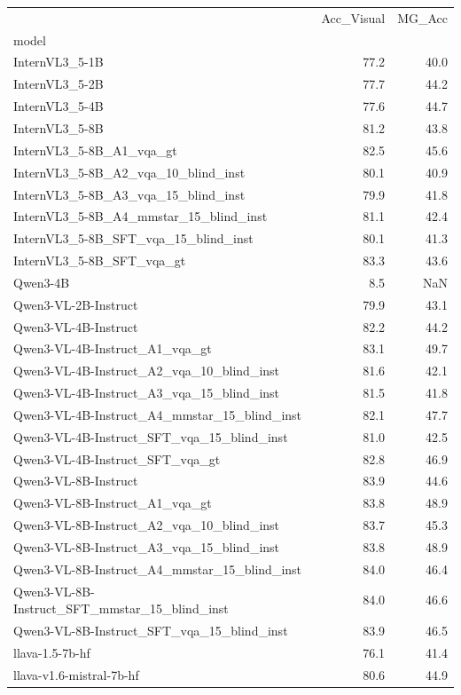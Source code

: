 \begin{tabular}{lrr}
\toprule
 & Acc_Visual & MG_Acc \\
model &  &  \\
\midrule
InternVL3_5-1B & 77.2 & 40.0 \\
InternVL3_5-2B & 77.7 & 44.2 \\
InternVL3_5-4B & 77.6 & 44.7 \\
InternVL3_5-8B & 81.2 & 43.8 \\
InternVL3_5-8B_A1_vqa_gt & 82.5 & 45.6 \\
InternVL3_5-8B_A2_vqa_10_blind_inst & 80.1 & 40.9 \\
InternVL3_5-8B_A3_vqa_15_blind_inst & 79.9 & 41.8 \\
InternVL3_5-8B_A4_mmstar_15_blind_inst & 81.1 & 42.4 \\
InternVL3_5-8B_SFT_vqa_15_blind_inst & 80.1 & 41.3 \\
InternVL3_5-8B_SFT_vqa_gt & 83.3 & 43.6 \\
Qwen3-4B & 8.5 & NaN \\
Qwen3-VL-2B-Instruct & 79.9 & 43.1 \\
Qwen3-VL-4B-Instruct & 82.2 & 44.2 \\
Qwen3-VL-4B-Instruct_A1_vqa_gt & 83.1 & 49.7 \\
Qwen3-VL-4B-Instruct_A2_vqa_10_blind_inst & 81.6 & 42.1 \\
Qwen3-VL-4B-Instruct_A3_vqa_15_blind_inst & 81.5 & 41.8 \\
Qwen3-VL-4B-Instruct_A4_mmstar_15_blind_inst & 82.1 & 47.7 \\
Qwen3-VL-4B-Instruct_SFT_vqa_15_blind_inst & 81.0 & 42.5 \\
Qwen3-VL-4B-Instruct_SFT_vqa_gt & 82.8 & 46.9 \\
Qwen3-VL-8B-Instruct & 83.9 & 44.6 \\
Qwen3-VL-8B-Instruct_A1_vqa_gt & 83.8 & 48.9 \\
Qwen3-VL-8B-Instruct_A2_vqa_10_blind_inst & 83.7 & 45.3 \\
Qwen3-VL-8B-Instruct_A3_vqa_15_blind_inst & 83.8 & 48.9 \\
Qwen3-VL-8B-Instruct_A4_mmstar_15_blind_inst & 84.0 & 46.4 \\
Qwen3-VL-8B-Instruct_SFT_mmstar_15_blind_inst & 84.0 & 46.6 \\
Qwen3-VL-8B-Instruct_SFT_vqa_15_blind_inst & 83.9 & 46.5 \\
llava-1.5-7b-hf & 76.1 & 41.4 \\
llava-v1.6-mistral-7b-hf & 80.6 & 44.9 \\

\end{tabular}

